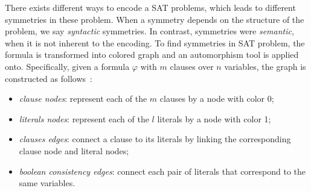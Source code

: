 There exists different ways to encode a SAT problems,
which leads to different symmetries in these problem.
When a symmetry depends on the structure of the problem, we say \emph{syntactic} symmetries. 
In contrast, symmetries were \emph{semantic}, when it is not inherent to the encoding.
To find symmetries in SAT problem, the formula is transformed into colored graph
and an automorphism tool is applied onto. Specifically, given a formula $\varphi$ with
$m$ clauses over $n$ variables, the graph is constructed as follows~\cite{biere2009handbook}:
\begin{itemize}
	\item \emph{clause nodes}: represent each of the $m$ clauses by a node with color 0;
	\item \emph{literals nodes}: represent each of the $l$ literals by a node with color 1;
	\item \emph{clauses edges}: connect a clause to its literals by linking the corresponding  clause node and literal nodes;
	\item \emph{boolean consistency edges}: connect each pair of literals that correspond to the same variables.
\end{itemize}


